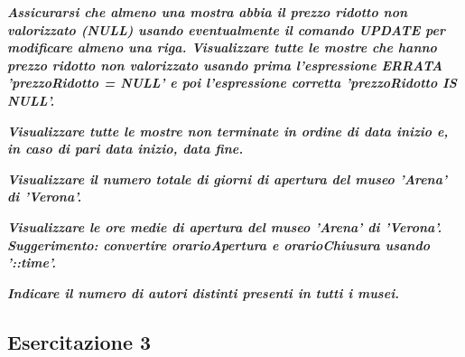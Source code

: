 \documentclass[a4paper]{article}
\begin{document}
	\noindent
	\newpage

	\noindent
	\textcolor{Green4}{\textbf{\emph{Assicurarsi che almeno una mostra abbia il prezzo ridotto non valorizzato (NULL) usando eventualmente il comando UPDATE per modificare almeno una riga. Visualizzare tutte le mostre che hanno prezzo ridotto non valorizzato usando prima l'espressione ERRATA '\textsf{prezzoRidotto = NULL}' e poi l'espressione corretta '\textsf{prezzoRidotto IS NULL}'.}}}\newline
	
	\noindent
	\:\newline

	\noindent
	\textcolor{Green4}{\textbf{\emph{Visualizzare tutte le mostre non terminate in ordine di data inizio e, in caso di pari data inizio, data fine.}}}\newline
	
	\noindent
	\:\newline

	\noindent
	\textcolor{Green4}{\textbf{\emph{Visualizzare il numero totale di giorni di apertura del museo 'Arena' di 'Verona'.}}}\newline
	
	\noindent
	\:\newline

	\noindent
	\textcolor{Green4}{\textbf{\emph{Visualizzare le ore medie di apertura del museo 'Arena' di 'Verona'. Suggerimento: convertire orarioApertura e orarioChiusura usando '::time'.}}}\newline
	
	\noindent
	\:\newline

	\noindent
	\textcolor{Green4}{\textbf{\emph{Indicare il numero di autori distinti presenti in tutti i musei.}}}\newline
	
	\noindent
	\newpage

	\subsection{Esercitazione 3}
\end{document}
